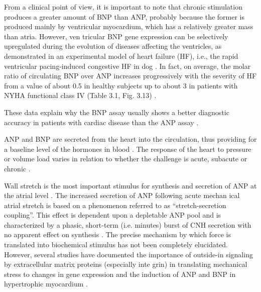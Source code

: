 \documentclass[14pt,a4paper,onecolumn]{extarticle}
\begin{document}
From a clinical point of view, it is important to note that chronic stimulation produces a greater amount of BNP than ANP, probably because the former is produced mainly by ventricular myocardium, which has a relatively greater mass than atria. However, ven tricular BNP gene expression can be selectively upregulated during the evolution of diseases affecting the ventricles, as demonstrated in an experimental model of heart failure (HF), i.e., the rapid ventricular pacing-induced congestive HF in dog \citep{27}. In fact, on average, the molar ratio of circulating BNP over ANP increases progressively with the severity of HF from a value of about 0.5 in healthy subjects up to about 3 in patients with NYHA functional class IV (Table 3.1, Fig. 3.13) \citep{28}.

These data explain why the BNP assay usually shows a better diagnostic accuracy in patients with cardiac disease than the ANP assay \citep{28}.

ANP and BNP are secreted from the heart into the circulation, thus providing for a baseline level of the hormones in blood \citep{13}. The response of the heart to pressure or volume load varies in relation to whether the challenge is acute, subacute or chronic \citep{12}\citep{13}.

Wall stretch is the most important stimulus for synthesis and secretion of ANP at the atrial level \citep{12}\citep{13}\citep{21-23}. The increased secretion of ANP following acute mechan ical atrial stretch is based on a phenomenon referred to as “stretch-secretion coupling”.  This effect is dependent upon a depletable ANP pool and is characterized by a phasic, short-term (i.e. minutes) burst of CNH secretion with no apparent effect on synthesis \citep{13}. The precise mechanism by which force is translated into biochemical stimulus has not been completely elucidated. However, several studies have documented the importance of outside-in signaling by extracellular matrix proteins (especially inte grin) in translating mechanical stress to changes in gene expression and the induction of ANP and BNP in hypertrophic myocardium \citep{22}.
\end{document}

